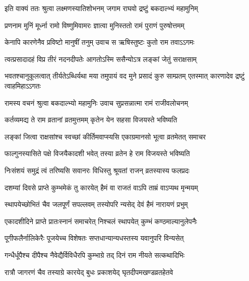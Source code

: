 
\twolineshloka
{इति वाक्यं ततः श्रुत्वा लक्ष्मणस्यातिशोभनम्}
{जगाम राघवो द्रष्टुं बकदाल्भ्यं महामुनिम्}%

\twolineshloka
{प्रणनाम मुनिं मूर्ध्ना रामो विष्णुमिवामरः}
{ज्ञात्वा मुनिस्ततो रामं पुराणं पुरुषोत्तमम्}%

\twolineshloka
{केनापि कारणेनैव प्रविष्टो मानुषीं तनुम्}
{उवाच स ऋषिस्तुष्टः कुतो राम तवाऽऽगमः}%


\twolineshloka
{त्वत्प्रसादादहं विप्र तीरं नदनदीपतेः}
{आगतोऽस्मि ससैन्योऽत्र लङ्कां जेतुं सराक्षसाम्}%

\threelineshloka
{भवतश्चानुकूलत्वात् तीर्यतेऽब्धिर्यथा मया}
{तमुपायं वद मुने प्रसादं कुरु साम्प्रतम्}%
{एतस्मात् कारणादेव द्रष्टुं त्वाहमिहाऽऽगतः}


\twolineshloka
{रामस्य वचनं श्रुत्वा बकदाल्भ्यो महामुनिः}%
{उवाच सुप्रसन्नात्मा रामं राजीवलोचनम्}


\twolineshloka
{कर्तव्यमद्य ते राम व्रतानां व्रतमुत्तमम्}
{कृतेन येन सहसा विजयस्ते भविष्यति}%

\twolineshloka
{लङ्कां जित्वा राक्षसांश्च स्वच्छां कीर्तिमवाप्स्यसि}
{एकाग्रमानसो भूत्वा व्रतमेतत् समाचर}%

\twolineshloka
{फाल्गुनस्यासिते पक्षे विजयैकादशी भवेत्}
{तस्या व्रतेन हे राम विजयस्ते भविष्यति}%

\twolineshloka
{निःसंशयं समुद्रं त्वं तरिष्यसि सवानरः}
{विधिस्तु श्रूयतां राजन् व्रतस्यास्य फलप्रदः}%

\twolineshloka
{दशम्यां दिवसे प्राप्ते कुम्भमेकं तु कारयेत्}
{हैमं वा राजतं वाऽपि ताम्रं वाऽप्यथ मृन्मयम्}%

\twolineshloka
{स्थापयेच्छोभितं चैव जलपूर्णं सपल्लवम्}
{तस्योपरि न्यसेद् देवं हैमं नारायणं प्रभुम्}%


\twolineshloka
{एकादशीदिने प्राप्ते प्रातःस्नानं समाचरेत्}
{निश्चलं स्थापयेत् कुम्भं कण्ठमाल्यानुलेपनैः}%

\twolineshloka
{पूगीफलैर्नालिकेरैः पूजयेच्च विशेषतः}
{सप्तधान्यान्यधस्तस्य यवानुपरि विन्यसेत्}%

\twolineshloka
{गन्धैर्धूपैश्च दीपैश्च नैवेद्यैर्विविधैरपि}
{कुम्भाग्रे तद् दिनं राम नीयते सत्कथादिभिः}%

\twolineshloka
{रात्रौ जागरणं चैव तस्याग्रे कारयेद् बुधः}
{प्रकाशयेद् घृतदीपमखण्डव्रतहेतवे}%

